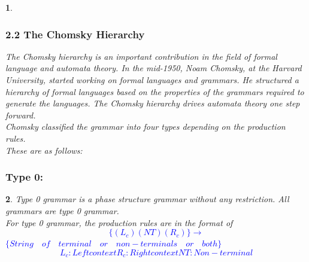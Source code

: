 \documentclass[12pt]{beamer}
\newtheorem{sol}{\textbf{Solution:}}
\newtheorem{tex}{}
\begin{document}

	
\begin{frame}
	
	\begin{tex}
	\frametitle{ 2.2 The Chomsky Hierarchy}
	The Chomsky hierarchy is an important contribution in the field of formal language and automata theory.  
	In the mid-1950, Noam Chomsky, at the Harvard University, started working on formal
	languages and grammars. He structured a hierarchy of formal languages based on the properties of the
	grammars required to generate the languages. The Chomsky hierarchy drives automata theory one step forward.\\
	Chomsky classified the grammar into four types depending on the production rules.\\
	These are as follows:\\
	\end{tex}
	
	
	
	
	
\end{frame}	

	
\begin{frame}
	
	\frametitle{Type 0:}
	
	\begin{tex}
	Type 0 grammar is a phase structure grammar without any restriction. All grammars are type 0 grammar.\\
		
	For type 0 grammar, the production rules are in the format of\\
   \textcolor{blue}{	\[\{(L_c)(NT)(R_c)\} \rightarrow\]
	\centering$ \{String\quad of\quad terminal\quad or\quad non-terminals\quad or\quad both\}$
	\[L_c: Left context R_c: Right context NT : Non-terminal \]     }
\end{tex}

\end{frame}	
\end{document}
